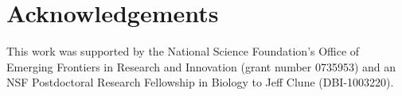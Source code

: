 \section{Acknowledgements}

This work was supported by the National Science Foundation's Office of
Emerging Frontiers in Research and Innovation (grant number 0735953)
and an NSF Postdoctoral Research Fellowship in Biology to Jeff Clune
(DBI-1003220).


